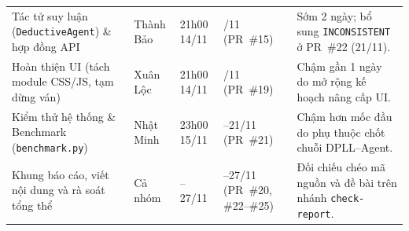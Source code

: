 \begin{sloppypar}
\begin{table}[!t]
\begin{tabularx}{\textwidth}{>{\raggedright\arraybackslash}p{4.0cm}>{\raggedright\arraybackslash}p{2.05cm}>{\raggedright\arraybackslash}p{1.75cm}>{\raggedright\arraybackslash}p{2.3cm}>{\raggedright\arraybackslash}X}
        Tác tử suy luận (\texttt{DeductiveAgent}) \& hợp đồng API & Thành Bảo & 21h00 14/11 & 12/11 (PR~\#15) & Sớm 2 ngày; bổ sung \texttt{INCONSISTENT} ở PR~\#22 (21/11). \\
        Hoàn thiện UI (tách module CSS/JS, tạm dừng ván) & Xuân Lộc & 21h00 14/11 & 15/11 (PR~\#19) & Chậm gần 1 ngày do mở rộng kế hoạch nâng cấp UI. \\
        Kiểm thử hệ thống \& Benchmark (\texttt{benchmark.py}) & Nhật Minh & 23h00 15/11 & 19--21/11 (PR~\#21) & Chậm hơn mốc đầu do phụ thuộc chốt chuỗi DPLL--Agent. \\
        Khung báo cáo, viết nội dung và rà soát tổng thể & Cả nhóm & 20--27/11 & 20--27/11 (PR~\#20, \#22--\#25) & Đối chiếu chéo mã nguồn và đề bài trên nhánh \texttt{check-report}. \\
        \bottomrule
    \end{tabularx}
\end{table}
\clearpage

\end{sloppypar}
